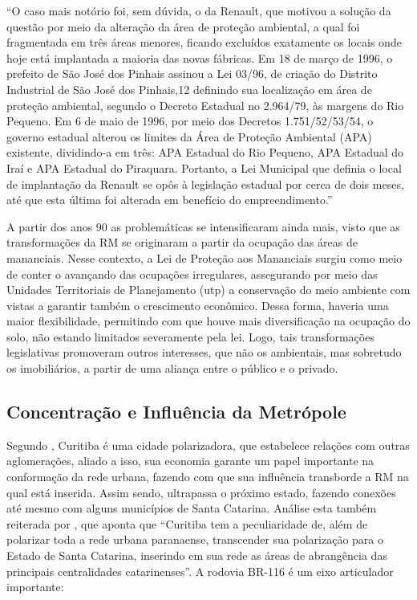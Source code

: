 	\begin{citacao}
		``O caso mais notório foi, sem dúvida, o da Renault, que motivou a solução da questão por meio da alteração da área de proteção ambiental, a qual foi fragmentada em três áreas menores, ficando excluídos exatamente os locais onde hoje está implantada a maioria das novas fábricas. Em 18 de março de 1996, o prefeito de São José dos Pinhais assinou a Lei 03/96, de criação do Distrito Industrial de São José dos Pinhais,12 definindo sua localização em área de proteção ambiental, segundo o Decreto Estadual no 2.964/79, às margens do Rio Pequeno. Em 6 de maio de 1996, por meio dos Decretos 1.751/52/53/54, o governo estadual alterou os limites da Área de Proteção Ambiental (APA) existente, dividindo-a em três: APA Estadual do Rio Pequeno, APA Estadual do Iraí e APA Estadual do Piraquara. Portanto, a Lei Municipal que definia o local de implantação da Renault se opôs à legislação estadual por cerca de dois meses, até que esta última foi alterada em benefício do empreendimento.'' \cite[p. 96]{firkowski2002b}
	\end{citacao}

	A partir dos anos 90 as problemáticas se intensificaram ainda mais, visto que as transformações da RM se originaram a partir da ocupação das áreas de mananciais. Nesse contexto, a Lei de Proteção aos Mananciais surgiu como meio de conter o avançando das ocupações irregulares, assegurando por meio das Unidades Territoriais de Planejamento (\gls{utp}) a conservação do meio ambiente com vistas a garantir também o crescimento econômico. Dessa forma, haveria uma maior flexibilidade, permitindo com que houve mais diversificação na ocupação do solo, não estando limitados severamente pela lei. Logo, tais transformações legislativas promoveram outros interesses, que não os ambientais, mas sobretudo os imobiliários, a partir de uma aliança entre o público e o privado.
	
	\subsection{Concentração e Influência da Metrópole}
		
	Segundo , Curitiba é uma cidade polarizadora, que estabelece relações com outras aglomerações, aliado a isso, sua economia garante um papel importante na conformação da rede urbana, fazendo com que sua influência transborde a RM na qual está inserida. Assim sendo, ultrapassa o próximo estado, fazendo conexões até mesmo com alguns municípios de Santa Catarina. Análise esta também reiterada por , que aponta que ``Curitiba tem a peculiaridade de, além de polarizar toda a rede urbana paranaense, transcender sua polarização para o Estado de Santa Catarina, inserindo em sua rede as áreas de abrangência das principais centralidades catarinenses''. A rodovia BR-116 é um eixo articulador importante:
	
